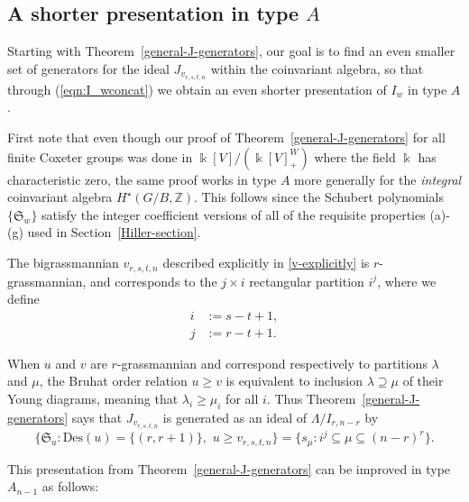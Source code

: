 \documentclass[12pt,dvips]{amsart}
\theoremstyle{plain}
\theoremstyle{definition}
\theoremstyle{remark}
\numberwithin{equation}{section}
\def\ZZ{{\mathbb Z}}
\def\schubp{\mathfrak{S}}
\def\Des{\mathrm{Des}}
\begin{document}
\subsection{A shorter presentation in type $A$}
\label{type-A-generators-subsection}

Starting with Theorem~\ref{general-J-generators}, our goal is to find
an even smaller set of generators for the ideal $J_{v_{r,s,t,n}}$
within the coinvariant algebra, so that through (\ref{eqn:I_wconcat})
we obtain an even shorter presentation of $I_w$ in type $A$.

First note that even though our proof of Theorem~\ref{general-J-generators}
for all finite Coxeter groups was done
in $\Bbbk[V]/(\Bbbk[V]^W_+)$ where the field $\Bbbk$ has characteristic zero,
the same proof works in type $A$ more generally for the {\it integral}
coinvariant algebra $H^\star(G/B,\ZZ)$. This follows since
the Schubert polynomials $\{\schubp_w\}$ satisfy the integer
coefficient versions of all of the requisite properties (a)-(g) used in Section~\ref{Hiller-section}.



The bigrassmannian $v_{r,s,t,n}$ described explicitly in \eqref{v-explicitly}
is $r$-grassmannian, and corresponds to the $j \times i$ 
rectangular partition $i^j$, where we define
$$
\begin{aligned}
i&:=s-t+1,\\
j&:=r-t+1.
\end{aligned}
$$


When $u$ and $v$ are $r$-grassmannian and correspond respectively to
partitions $\lambda$ and $\mu$, the Bruhat order relation $u \geq v$
is equivalent to inclusion $\lambda \supseteq \mu$ of their Young
diagrams, meaning that $\lambda_i \geq \mu_i$ for all $i$.  Thus
Theorem~\ref{general-J-generators} says that $J_{v_{r,s,t,n}}$ is
generated as an ideal of $\Lambda/I_{r,n-r}$ by
\begin{equation}
\label{step0-generators}
\{\schubp_u: \Des(u) = \{(r,r+1)\}, \,\, u \geq v_{r,s,t,n}\}
=\{ s_{\mu}: i^j \subseteq \mu \subseteq (n-r)^r \}.
\end{equation}

This presentation from Theorem~\ref{general-J-generators} can be
improved in type $A_{n-1}$ as follows:
\end{document}
